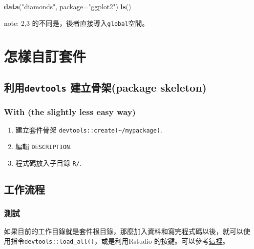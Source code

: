 \documentclass[]{book}
\newenvironment{Shaded}{\begin{snugshade}}{\end{snugshade}}
\newcommand{\DataTypeTok}[1]{\textcolor[rgb]{0.13,0.29,0.53}{#1}}
\newcommand{\KeywordTok}[1]{\textcolor[rgb]{0.13,0.29,0.53}{\textbf{#1}}}
\newcommand{\NormalTok}[1]{#1}
\newcommand{\StringTok}[1]{\textcolor[rgb]{0.31,0.60,0.02}{#1}}
\providecommand{\tightlist}{%
  \setlength{\itemsep}{0pt}\setlength{\parskip}{0pt}}
\theoremstyle{definition}
\theoremstyle{definition}
\theoremstyle{definition}
\theoremstyle{remark}
\begin{document}
\begin{Shaded}
\begin{Highlighting}[]
\KeywordTok{data}\NormalTok{(}\StringTok{"diamonds"}\NormalTok{, }\DataTypeTok{package=}\StringTok{"ggplot2"}\NormalTok{)}
\KeywordTok{ls}\NormalTok{()}
\end{Highlighting}
\end{Shaded}

note: 2,3 的不同是，後者直接導入\texttt{global}空間。

\section{怎樣自訂套件}

\hypertarget{devtools-package-skeleton}{%
\subsection{\texorpdfstring{利用\texttt{devtools} 建立骨架(package
skeleton)}{利用devtools 建立骨架(package skeleton)}}\label{devtools-package-skeleton}}

\hypertarget{with-the-slightly-less-easy-way}{%
\subsubsection{With (the slightly less easy
way)}\label{with-the-slightly-less-easy-way}}

\begin{enumerate}
\def\labelenumi{\arabic{enumi}.}
\tightlist
\item
  建立套件骨架
  \texttt{devtools::create(\textquotesingle{}\textasciitilde{}/mypackage\textquotesingle{})}.
\item
  編輯 \texttt{DESCRIPTION}.
\item
  程式碼放入子目錄 \texttt{R/}.
\end{enumerate}

\subsection{工作流程}

\subsubsection{測試}

如果目前的工作目錄就是套件根目錄，那麼加入資料和寫完程式碼以後，就可以使用指令\texttt{devtools::load\_all()}，或是利用Rstudio
的按鍵。可以參考\href{http://r-pkgs.had.co.nz/r.html\#r-workflow}{這裡}。
\end{document}
